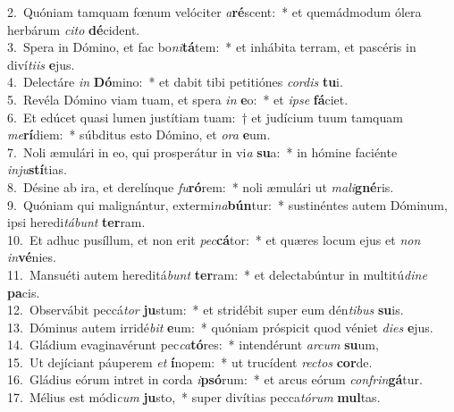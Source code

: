 {2.~}Quóniam tamquam fœnum velóciter \textit{a}\textbf{ré}scent:~* et quemádmodum ólera herbárum \textit{ci}\textit{to} \textbf{dé}cident.\\
{3.~}Spera in Dómino, et fac bo\textit{ni}\textbf{tá}tem:~* et inhábita terram, et pascéris in diví\textit{ti}\textit{is} \textbf{e}jus.\\
{4.~}Delectáre \textit{in} \textbf{Dó}mino:~* et dabit tibi petitiónes \textit{cor}\textit{dis} \textbf{tu}i.\\
{5.~}Revéla Dómino viam tuam, et spera \textit{in} \textbf{e}o:~* et \textit{i}\textit{pse} \textbf{fá}ciet.\\
{6.~}Et edúcet quasi lumen justítiam tuam:~† et judícium tuum tamquam \textit{me}\textbf{rí}diem:~* súbditus esto Dómino, et \textit{o}\textit{ra} \textbf{e}um.\\
{7.~}Noli æmulári in eo, qui prosperátur in vi\textit{a} \textbf{su}a:~* in hómine faciénte \textit{in}\textit{ju}\textbf{stí}tias.\\
{8.~}Désine ab ira, et derelínque \textit{fu}\textbf{ró}rem:~* noli æmulári ut \textit{ma}\textit{li}\textbf{gné}ris.\\
{9.~}Quóniam qui malignántur, extermi\textit{na}\textbf{bún}tur:~* sustinéntes autem Dóminum, ipsi heredi\textit{tá}\textit{bunt} \textbf{ter}ram.\\
{10.~}Et adhuc pusíllum, et non erit \textit{pec}\textbf{cá}tor:~* et quæres locum ejus et \textit{non} \textit{in}\textbf{vé}nies.\\
{11.~}Mansuéti autem hereditá\textit{bunt} \textbf{ter}ram:~* et delectabúntur in multitú\textit{di}\textit{ne} \textbf{pa}cis.\\
{12.~}Observábit peccá\textit{tor} \textbf{ju}stum:~* et stridébit super eum dén\textit{ti}\textit{bus} \textbf{su}is.\\
{13.~}Dóminus autem irridé\textit{bit} \textbf{e}um:~* quóniam próspicit quod véniet \textit{di}\textit{es} \textbf{e}jus.\\
{14.~}Gládium evaginavérunt pec\textit{ca}\textbf{tó}res:~* intendérunt \textit{ar}\textit{cum} \textbf{su}um,\\
{15.~}Ut dejíciant páuperem \textit{et} \textbf{í}nopem:~* ut trucídent \textit{re}\textit{ctos} \textbf{cor}de.\\
{16.~}Gládius eórum intret in corda \textit{i}\textbf{psó}rum:~* et arcus eórum \textit{con}\textit{frin}\textbf{gá}tur.\\
{17.~}Mélius est módi\textit{cum} \textbf{ju}sto,~* super divítias pecca\textit{tó}\textit{rum} \textbf{mul}tas.\\

